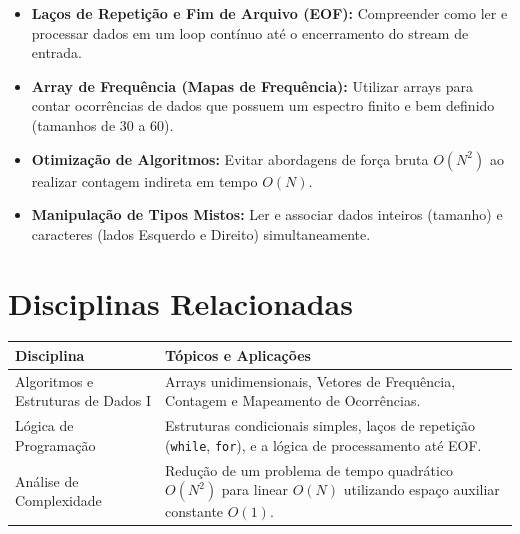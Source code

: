 \documentclass[11pt]{article}
\begin{document}

\begin{objetivobox}
\begin{itemize}
    \item \textbf{Laços de Repetição e Fim de Arquivo (EOF):} Compreender como ler e processar dados em um loop contínuo até o encerramento do stream de entrada.
    \item \textbf{Array de Frequência (Mapas de Frequência):} Utilizar arrays para contar ocorrências de dados que possuem um espectro finito e bem definido (tamanhos de 30 a 60).
    \item \textbf{Otimização de Algoritmos:} Evitar abordagens de força bruta $O(N^2)$ ao realizar contagem indireta em tempo $O(N)$.
    \item \textbf{Manipulação de Tipos Mistos:} Ler e associar dados inteiros (tamanho) e caracteres (lados Esquerdo e Direito) simultaneamente.
\end{itemize}
\end{objetivobox}

\section{Disciplinas Relacionadas}

\begin{table}[h]
    \centering
    \begin{tabularx}{\textwidth}{>{\raggedright\arraybackslash}p{4cm} X}
        \toprule
        \textbf{Disciplina} & \textbf{Tópicos e Aplicações} \\
        \midrule
        Algoritmos e Estruturas de Dados I & Arrays unidimensionais, Vetores de Frequência, Contagem e Mapeamento de Ocorrências. \\
        \midrule
        Lógica de Programação & Estruturas condicionais simples, laços de repetição (\texttt{while}, \texttt{for}), e a lógica de processamento até EOF. \\
        \midrule
        Análise de Complexidade & Redução de um problema de tempo quadrático $O(N^2)$ para linear $O(N)$ utilizando espaço auxiliar constante $O(1)$. \\
        \bottomrule
    \end{tabularx}
\end{table}

\end{document}
